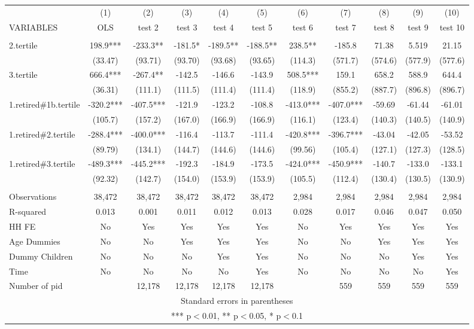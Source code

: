\begin{tabular}{lcccccccccc} \hline
 & (1) & (2) & (3) & (4) & (5) & (6) & (7) & (8) & (9) & (10) \\
VARIABLES & OLS & test 2 & test 3 & test 4 & test 5 & test 6 & test 7 & test 8 & test 9 & test 10 \\ \hline
 &  &  &  &  &  &  &  &  &  &  \\
2.tertile & 198.9*** & -233.3** & -181.5* & -189.5** & -188.5** & 238.5** & -185.8 & 71.38 & 5.519 & 21.15 \\
 & (33.47) & (93.71) & (93.70) & (93.68) & (93.65) & (114.3) & (571.7) & (574.6) & (577.9) & (577.6) \\
3.tertile & 666.4*** & -267.4** & -142.5 & -146.6 & -143.9 & 508.5*** & 159.1 & 658.2 & 588.9 & 644.4 \\
 & (36.31) & (111.1) & (111.5) & (111.4) & (111.4) & (118.9) & (855.2) & (887.7) & (896.8) & (896.7) \\
1.retired\#1b.tertile & -320.2*** & -407.5*** & -121.9 & -123.2 & -108.8 & -413.0*** & -407.0*** & -59.69 & -61.44 & -61.01 \\
 & (105.7) & (157.2) & (167.0) & (166.9) & (166.9) & (116.1) & (123.4) & (140.3) & (140.5) & (140.9) \\
1.retired\#2.tertile & -288.4*** & -400.0*** & -116.4 & -113.7 & -111.4 & -420.8*** & -396.7*** & -43.04 & -42.05 & -53.52 \\
 & (89.79) & (134.1) & (144.7) & (144.6) & (144.6) & (99.56) & (105.4) & (127.1) & (127.3) & (128.5) \\
1.retired\#3.tertile & -489.3*** & -445.2*** & -192.3 & -184.9 & -173.5 & -424.0*** & -450.9*** & -140.7 & -133.0 & -133.1 \\
 & (92.32) & (142.7) & (154.0) & (153.9) & (153.9) & (105.5) & (112.4) & (130.4) & (130.5) & (130.9) \\
 &  &  &  &  &  &  &  &  &  &  \\
Observations & 38,472 & 38,472 & 38,472 & 38,472 & 38,472 & 2,984 & 2,984 & 2,984 & 2,984 & 2,984 \\
R-squared & 0.013 & 0.001 & 0.011 & 0.012 & 0.013 & 0.028 & 0.017 & 0.046 & 0.047 & 0.050 \\
HH FE & No & Yes & Yes & Yes & Yes & No & Yes & Yes & Yes & Yes \\
Age Dummies & No & No & Yes & Yes & Yes & No & No & Yes & Yes & Yes \\
Dummy Children & No & No & No & Yes & Yes & No & No & No & Yes & Yes \\
Time & No & No & No & No & Yes & No & No & No & No & Yes \\
 Number of pid &  & 12,178 & 12,178 & 12,178 & 12,178 &  & 559 & 559 & 559 & 559 \\ \hline
\multicolumn{11}{c}{ Standard errors in parentheses} \\
\multicolumn{11}{c}{ *** p$<$0.01, ** p$<$0.05, * p$<$0.1} \\
\end{tabular}
